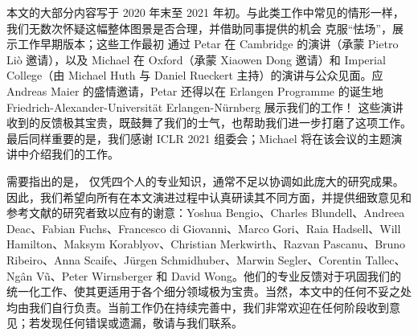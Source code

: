 本文的大部分内容写于 2020 年末至 2021 年初。与此类工作中常见的情形一样，我们无数次怀疑这幅整体图景是否合理，并借助同事提供的机会
%
克服“怯场”，展示工作早期版本；这些工作最初
通过 Petar 在 Cambridge 的演讲（承蒙 Pietro Li{\`o} 邀请），以及 Michael 在 Oxford（承蒙 Xiaowen Dong 邀请）和 Imperial College（由 Michael Huth 与 Daniel Rueckert 主持）的演讲与公众见面。应 Andreas Maier 的盛情邀请，Petar 还得以在 Erlangen Programme 的诞生地 Friedrich-Alexander-Universit\"{a}t Erlangen-N\"{u}rnberg 展示我们的工作！
%
%
这些演讲收到的反馈极其宝贵，既鼓舞了我们的士气，也帮助我们进一步打磨了这项工作。
最后同样重要的是，我们感谢 ICLR 2021 组委会；Michael 将在该会议的主题演讲中介绍我们的工作。



需要指出的是，
仅凭四个人的专业知识，通常不足以协调如此庞大的研究成果。因此，我们希望向所有在本文演进过程中认真研读其不同方面，并提供细致意见和参考文献的研究者致以应有的谢意：Yoshua Bengio、Charles Blundell、Andreea Deac、Fabian Fuchs、Francesco di Giovanni、Marco Gori、Raia Hadsell、Will Hamilton、Maksym Korablyov、Christian Merkwirth、Razvan Pascanu、Bruno Ribeiro、Anna Scaife、J\"{u}rgen Schmidhuber、Marwin Segler、Corentin Tallec、Ng\^{a}n V\~{u}、Peter Wirnsberger 和 David Wong。他们的专业反馈对于巩固我们的统一化工作、使其更适用于各个细分领域极为宝贵。当然，本文中的任何不妥之处均由我们自行负责。当前工作仍在持续完善中，我们非常欢迎在任何阶段收到意见；若发现任何错误或遗漏，敬请与我们联系。
